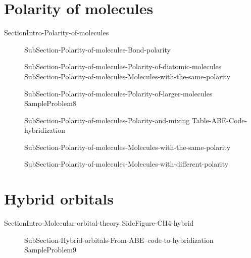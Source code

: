 \documentclass[main.tex]{subfiles}
\begin{document}
\section{Polarity of molecules}{SectionIntro-Polarity-of-molecules}
\sloppy \begin{description}
\item[] {SubSection-Polarity-of-molecules-Bond-polarity}
\item[] {SubSection-Polarity-of-molecules-Polarity-of-diatomic-molecules}
{SubSection-Polarity-of-molecules-Molecules-with-the-same-polarity}
\item[] {SubSection-Polarity-of-molecules-Polarity-of-larger-molecules}
{SampleProblem8}
\item[] {SubSection-Polarity-of-molecules-Polarity-and-mixing}
{Table-ABE-Code-hybridization}
\item[] {SubSection-Polarity-of-molecules-Molecules-with-the-same-polarity}
\item[] {SubSection-Polarity-of-molecules-Molecules-with-different-polarity}
\end{description}

\section{Hybrid orbitals}{SectionIntro-Molecular-orbital-theory}
{SideFigure-CH4-hybrid}	
\sloppy \begin{description}
\item[] {SubSection-Hybrid-orbitals-From-ABE--code-to-hybridization}
{SampleProblem9}
\end{description}
\end{document}
